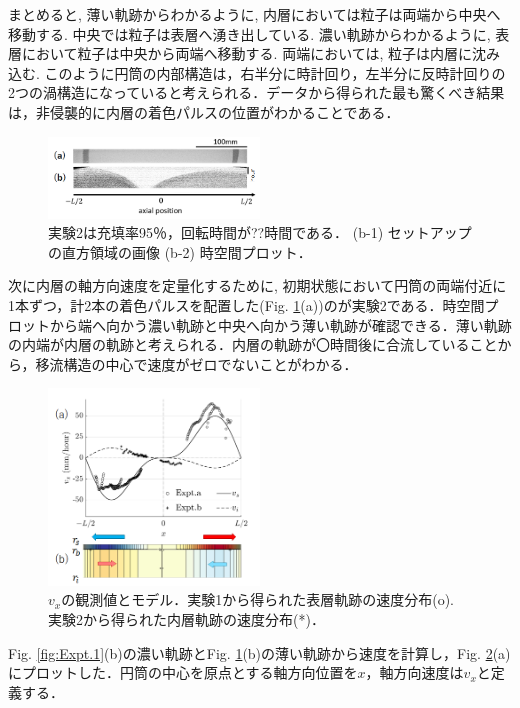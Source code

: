 \documentclass[prl,twocolumn,superscriptaddress]{revtex4}
\begin{document}
まとめると, 薄い軌跡からわかるように, 内層においては粒子は両端から中央へ移動する. 中央では粒子は表層へ湧き出している. 濃い軌跡からわかるように, 表層において粒子は中央から両端へ移動する. 両端においては, 粒子は内層に沈み込む. このように円筒の内部構造は，右半分に時計回り，左半分に反時計回りの2つの渦構造になっていると考えられる．データから得られた最も驚くべき結果は，非侵襲的に内層の着色パルスの位置がわかることである．\\

\begin{figure}[tb]
	\centering
	\includegraphics[width=0.5\textwidth]{figure/42_gray.png}
	\caption{実験2は充填率95％，回転時間が??時間である． (b-1) セットアップの直方領域の画像  (b-2) 時空間プロット．}
	\label{fig:Expt.2}
\end{figure}
次に内層の軸方向速度を定量化するために, 初期状態において円筒の両端付近に1本ずつ，計2本の着色パルスを配置した(Fig. \ref{fig:Expt.2}(a))のが実験2である．時空間プロットから端へ向かう濃い軌跡と中央へ向かう薄い軌跡が確認できる．薄い軌跡の内端が内層の軌跡と考えられる．内層の軌跡が〇時間後に合流していることから，移流構造の中心で速度がゼロでないことがわかる．\\

\begin{figure}[tb]
	\centering
	\includegraphics[width=0.5\textwidth]{figure/observed_and_model_vx.png}
	\caption{$v_x$の観測値とモデル．実験1から得られた表層軌跡の速度分布(o). 実験2から得られた内層軌跡の速度分布(*)．}
	\label{fig:profile_model_vx}
\end{figure}
Fig. \ref{fig:Expt.1}(b)の濃い軌跡とFig. \ref{fig:Expt.2}(b)の薄い軌跡から速度を計算し，Fig. \ref{fig:profile_model_vx}(a)にプロットした．円筒の中心を原点とする軸方向位置を$x$，軸方向速度は$v_x$と定義する．\\
\end{document}
